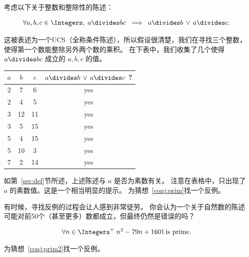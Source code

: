 考虑以下关于整数和整除性的陈述：

\begin{conj} \label{conj:prim}
      \[ \forall a,b,c \in \Integers, \; a \divides bc \; \implies \; a \divides b \,
            \lor \, a \divides c. \]
\end{conj}

这被表述为一个UCS（全称条件陈述），所以假设很清楚，我们在寻找三个整数，使得第一个数能整除另外两个数的乘积。
在下表中，我们收集了几个使得 $a \divides bc$ 成立的 $a, b, c$ 的值。
\begin{center}
      \begin{tabular}{c|c|c|c}
            $a$ & $b$ & $c$ & $ a \divides b \, \lor \, a \divides c $ ? \\ \hline
            2   & 7   & 6   & yes                                        \\
            2   & 4   & 5   & yes                                        \\
            3   & 12  & 11  & yes                                        \\
            3   & 5   & 15  & yes                                        \\
            5   & 4   & 15  & yes                                        \\
            5   & 10  & 3   & yes                                        \\
            7   & 2   & 14  & yes                                        \\
      \end{tabular}
\end{center}

\begin{exer}     
      如第~\ref{sec:def}节所述，上述陈述与 $a$ 是否为素数有关。
      注意在表格中，只出现了 $a$ 的素数值。这是一个相当明显的提示。
      为猜想~\ref{conj:prim}找一个反例。
\end{exer}

有时候，寻找反例的过程会让人感到非常徒劳。
你会认为一个关于自然数的陈述可能对前50个（甚至更多）数都成立，但最终仍然是错误的吗？

\begin{conj}
      \label{conj:prim2}
      \[ \forall n \in \Integers^+ \; n^2 - 79n + 1601 \, \mbox{is prime.} \]
\end{conj}

\begin{exer}
      为猜想~\ref{conj:prim2}找一个反例。
\end{exer}


